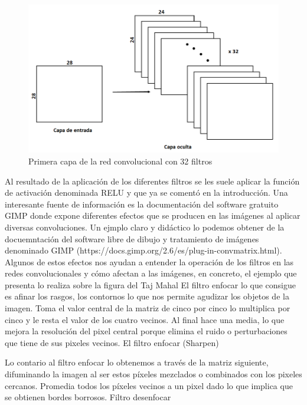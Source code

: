 \documentclass[
  a4paper,
  DIV=11,
  numbers=noendperiod]{scrreprt}
\begin{document}
\begin{figure}

{\centering \includegraphics{imagenes/capitulo1/primera_capa_convolucional.png}

}

\caption{\label{fig-primera-capa-convolucional}Primera capa de la red
convolucional con 32 filtros}

\end{figure}

Al resultado de la aplicación de los diferentes filtros se les suele
aplicar la función de activación denominada RELU y que ya se comentó en
la introducción. Una interesante fuente de información es la
documentación del software gratuito GIMP donde expone diferentes efectos
que se producen en las imágenes al aplicar diversas convoluciones. Un
ejmplo claro y didáctico lo podemos obtener de la docuemntación del
software libre de dibujo y tratamiento de imágenes denominado GIMP
(https://docs.gimp.org/2.6/es/plug-in-convmatrix.html). Algunos de estos
efectos nos ayudan a entender la operación de los filtros en las redes
convolucionales y cómo afectan a las imágenes, en concreto, el ejemplo
que presenta lo realiza sobre la figura del Taj Mahal El filtro enfocar
lo que consigue es afinar los rasgos, los contornos lo que nos permite
agudizar los objetos de la imagen. Toma el valor central de la matriz de
cinco por cinco lo multiplica por cinco y le resta el valor de los
cuatro vecinos. Al final hace una media, lo que mejora la resolución del
pixel central porque elimina el ruido o perturbaciones que tiene de sus
pixeles vecinos. El filtro enfocar (Sharpen)

Lo contario al filtro enfocar lo obtenemos a través de la matriz
siguiente, difuminando la imagen al ser estos píxeles mezclados o
combinados con los pixeles cercanos. Promedia todos los píxeles vecinos
a un pixel dado lo que implica que se obtienen bordes borrosos. Filtro
desenfocar
\end{document}
